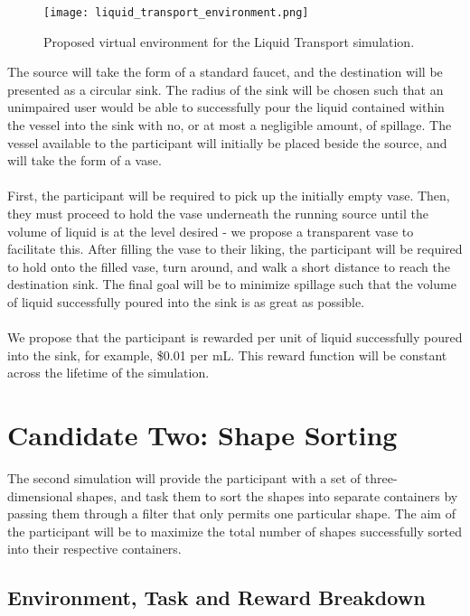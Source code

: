 \documentclass{article}
\begin{document}
\begin{figure}[H]
    \texttt{[image: liquid\_transport\_environment.png]}
    \centering
    \caption{Proposed virtual environment for the Liquid Transport simulation.}
\end{figure}

The source will take the form of a standard faucet, and the destination will be presented as a circular sink. The radius of the sink will be chosen such that an unimpaired user would be able to successfully pour the liquid contained within the vessel into the sink with no, or at most a negligible amount, of spillage. The vessel available to the participant will initially be placed beside the source, and will take the form of a vase.
\\
\\
First, the participant will be required to pick up the initially empty vase. Then, they must proceed to hold the vase underneath the running source until the volume of liquid is at the level desired - we propose a transparent vase to facilitate this. After filling the vase to their liking, the participant will be required to hold onto the filled vase, turn around, and walk a short distance to reach the destination sink. The final goal will be to minimize spillage such that the volume of liquid successfully poured into the sink is as great as possible.
\\
\\
We propose that the participant is rewarded per unit of liquid successfully poured into the sink, for example, \$0.01 per mL. This reward function will be constant across the lifetime of the simulation.

\section*{Candidate Two: Shape Sorting}

The second simulation will provide the participant with a set of three-dimensional shapes, and task them to sort the shapes into separate containers by passing them through a filter that only permits one particular shape. The aim of the participant will be to maximize the total number of shapes successfully sorted into their respective containers.

\subsection*{Environment, Task and Reward Breakdown}
\end{document}
